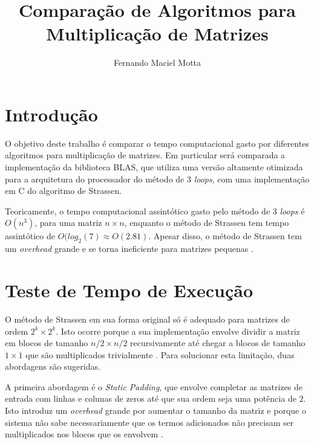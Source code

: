 \documentclass[12pt,a4paper,onecolumn]{article}
\title{Comparação de Algoritmos para Multiplicação de Matrizes}
\date{}
\author{Fernando Maciel Motta}
\begin{document}
\setcounter{section}{1}
\maketitle

\onehalfspacing

\section*{Introdução}

O objetivo deste trabalho é comparar o tempo computacional gasto por diferentes algoritmos para multiplicação de matrizes.
Em particular será comparada a implementação da biblioteca BLAS, que utiliza uma versão altamente otimizada para a arquitetura do processador do método
de 3 \emph{loops}, com uma implementação em C do algoritmo de Strassen.

Teoricamente, o tempo computacional assintótico gasto pelo método de 3 \emph{loops} é $O(n^3)$, para uma matriz $n \times n$, enquanto o método de Strassen
tem tempo assintótico de $O(log_2(7) \approx O(2.81)$. Apesar disso, o método de Strassen tem um \emph{overhead} grande e se torna ineficiente para matrizes
pequenas \cite{Demmel, Pan}.

\section*{Teste de Tempo de Execução}

O método de Strassen em sua forma original só é adequado para matrizes de ordem $2^k \times 2^k$. Isto ocorre porque a sua implementação envolve dividir a matriz em 
blocos de tamanho $n/2 \times n/2$ recursivamente até chegar a blocos de tamanho $1 \times 1$ que são multiplicados trivialmente \cite{Strassen}. Para solucionar esta
limitação, duas abordagens são sugeridas.

A primeira abordagem é o \emph{Static Padding}, que envolve completar as matrizes de entrada com linhas e colunas de zeros até
que sua ordem seja uma potência de $2$. Isto introduz um \emph{overhead} grande por aumentar o tamanho da matriz e porque o sistema não sabe necessariamente que os termos
adicionados não precisam ser multiplicados nos blocos que os envolvem \cite{Lederman}.
\end{document}
